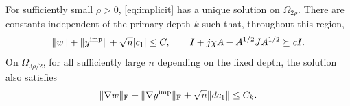 \begin{lemma}\label{lem:implicit-construction}
For sufficiently small $\rho>0$, \eqref{eq:implicit} has a unique solution
on $\Omega_{2\rho}$.  There are constants independent of the primary
depth $k$ such that, throughout this region,
\begin{equation}
 \lVert w\rVert+\lVert y^{\rm imp}\rVert+\sqrt n|c_1|\leq C,
 \qquad
 I+j\chi A-A^{1/2}JA^{1/2}\succeq cI.
 \label{eq:implicit-size}
\end{equation}
On $\Omega_{3\rho/2}$, for all sufficiently large $n$ depending on the
fixed depth, the solution also satisfies
\begin{equation}
 \lVert \nabla w\rVert_{\mathrm F}+\lVert \nabla y^{\rm imp}\rVert_{\mathrm F}
       +\sqrt n\lVert dc_1\rVert\leq C_k.
 \label{eq:implicit-frobenius}
\end{equation}
\end{lemma}

